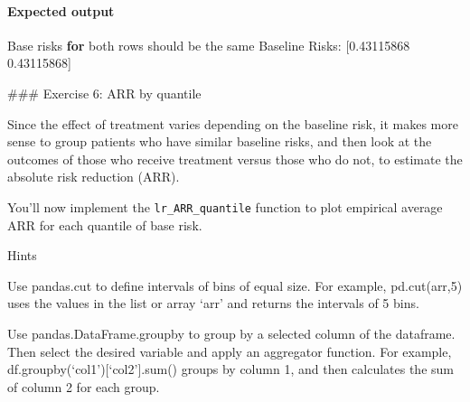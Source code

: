 \documentclass[11pt]{article}
\newenvironment{Shaded}{}{}
\newcommand{\FloatTok}[1]{\textcolor[rgb]{0.25,0.63,0.44}{{#1}}}
\newcommand{\NormalTok}[1]{{#1}}
\newcommand{\ControlFlowTok}[1]{\textcolor[rgb]{0.00,0.44,0.13}{\textbf{{#1}}}}
\begin{document}
    \hypertarget{expected-output}{%
\paragraph{Expected output}\label{expected-output}}

\begin{Shaded}
\begin{Highlighting}[]
\NormalTok{Base risks }\ControlFlowTok{for}\NormalTok{ both rows should be the same}
\NormalTok{Baseline Risks: [}\FloatTok{0.43115868} \FloatTok{0.43115868}\NormalTok{]}
\end{Highlighting}
\end{Shaded}

     \#\#\# Exercise 6: ARR by quantile

Since the effect of treatment varies depending on the baseline risk, it
makes more sense to group patients who have similar baseline risks, and
then look at the outcomes of those who receive treatment versus those
who do not, to estimate the absolute risk reduction (ARR).

You'll now implement the \texttt{lr\_ARR\_quantile} function to plot
empirical average ARR for each quantile of base risk.

     Hints

Use pandas.cut to define intervals of bins of equal size. For example,
pd.cut(arr,5) uses the values in the list or array `arr' and returns the
intervals of 5 bins.

Use pandas.DataFrame.groupby to group by a selected column of the
dataframe. Then select the desired variable and apply an aggregator
function. For example, df.groupby(`col1'){[}`col2'{]}.sum() groups by
column 1, and then calculates the sum of column 2 for each group.
\end{document}
